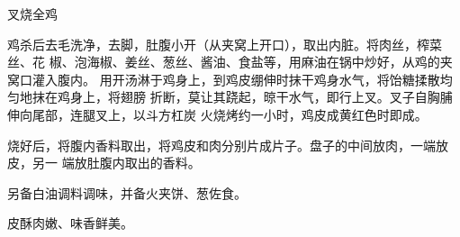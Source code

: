 %
%
%
%
%
%
%
\begin{recipe}{叉烧全鸡}

\ingredients


\preparation

鸡杀后去毛洗净，去脚，肚腹小开（从夹窝上开口），取出内脏。将肉丝，榨菜丝、花
椒、泡海椒、姜丝、葱丝、酱油、食盐等，用麻油在锅中炒好，从鸡的夹窝口灌入腹内。
用开汤淋于鸡身上，到鸡皮绷伸时抹干鸡身水气，将饴糖揉散均匀地抹在鸡身上，将翅膀
折断，莫让其跷起，晾干水气，即行上叉。叉子自胸脯伸向尾部，连腿叉上，以斗方杠炭
火烧烤约一小时，鸡皮成黄红色时即成。

烧好后，将腹内香料取出，将鸡皮和肉分别片成片子。盘子的中间放肉，一端放皮，另一
端放肚腹内取出的香料。

另备白油调料调味，并备火夹饼、葱佐食。

\features

皮酥肉嫩、味香鲜美。

\end{recipe}

